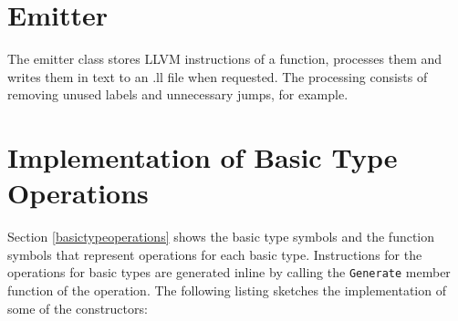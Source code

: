 \documentclass[a4paper,oneside,11pt]{book}
\theoremstyle{definition}
\begin{document}
\section{Emitter}

The emitter class stores LLVM instructions of a function, processes them and writes them in text to an .ll file when requested.
The processing consists of removing unused labels and unnecessary jumps, for example.

\section{Implementation of Basic Type Operations}

Section \ref{basictypeoperations} shows the basic type symbols and the function symbols that represent operations for each basic type.
Instructions for the operations for basic types are generated inline by calling the \verb|Generate| member function of the operation.
The following listing sketches the implementation of some of the constructors:
\end{document}
